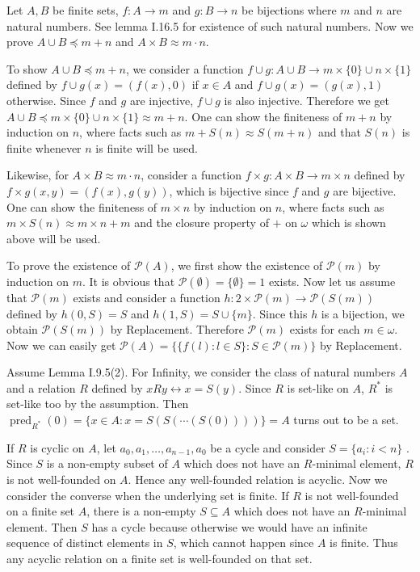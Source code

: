 \documentclass[12pt]{article}
\newcommand{\pred}{\mathop{\mathrm{pred}}}
\theoremstyle{definition}
\newenvironment{customthm}[1]
  {\renewcommand\theinnercustomthm{#1}\innercustomthm}
  {\endinnercustomthm}
\begin{document}
\begin{customthm}{I.7.27}
  Let $A,B$ be finite sets, $f:A\rightarrow m$ and $g:B\rightarrow n$ be bijections where $m$ and $n$ are natural numbers. See lemma I.16.5 for existence of such natural numbers. Now we prove $A\cup B\preccurlyeq m+n$ and $A\times B\approx m\cdot n$.

  To show $A\cup B\preccurlyeq m+n$, we consider a function $f\cup g:A\cup B\rightarrow m\times\{0\}\cup n\times\{1\}$ defined by $f\cup g(x)=(f(x),0)$ if $x\in A$ and $f\cup g(x)=(g(x),1)$ otherwise. Since $f$ and $g$ are injective, $f\cup g$ is also injective. Therefore we get $A\cup B\preccurlyeq m\times\{0\}\cup n\times\{1\}\approx m+n$. One can show the finiteness of $m+n$ by induction on $n$, where facts such as $m+S(n)\approx S(m+n)$ and that $S(n)$ is finite whenever $n$ is finite will be used.

  Likewise, for $A\times B\approx m\cdot n$, consider a function $f\times g:A\times B\rightarrow m\times n$ defined by $f\times g(x,y)=(f(x),g(y))$, which is bijective since $f$ and $g$ are bijective. One can show the finiteness of $m\times n$ by induction on $n$, where facts such as $m\times S(n)\approx m\times n+m$ and the closure property of $+$ on $\omega$ which is shown above will be used.

  To prove the existence of $\mathcal{P}(A)$, we first show the existence of $\mathcal{P}(m)$ by induction on $m$. It is obvious that $\mathcal{P}(\emptyset)=\{\emptyset\}=1$ exists. Now let us assume that $\mathcal{P}(m)$ exists and consider a function $h:2\times\mathcal{P}(m)\rightarrow\mathcal{P}(S(m))$ defined by $h(0,S)=S$ and $h(1,S)=S\cup\{m\}$. Since this $h$ is a bijection, we obtain $\mathcal{P}(S(m))$ by Replacement. Therefore $\mathcal{P}(m)$ exists for each $m\in\omega$. Now we can easily get $\mathcal{P}(A)=\{\{f(l):l\in S\}:S\in\mathcal{P}(m)\}$ by Replacement.
\end{customthm}

\begin{customthm}{I.9.6}
  Assume Lemma I.9.5(2). For Infinity, we consider the class of natural numbers $A$ and a relation $R$ defined by $xRy\leftrightarrow x=S(y)$. Since $R$ is set-like on $A$, $R^*$ is set-like too by the assumption. Then $\pred_{R^*}(0)=\{x\in A:x=S(S(\cdots (S(0))))\}=A$ turns out to be a set.
\end{customthm}

\begin{customthm}{I.9.8}
  If $R$ is cyclic on $A$, let $a_0,a_1,\ldots,a_{n-1},a_0$ be a cycle and consider $S=\{a_i:i<n\}$ . Since $S$ is a non-empty subset of $A$ which does not have an $R$-minimal element, $R$ is not well-founded on $A$. Hence any well-founded relation is acyclic. Now we consider the converse when the underlying set is finite. If $R$ is not well-founded on a finite set $A$, there is a non-empty $S\subseteq A$ which does not have an $R$-minimal element. Then $S$ has a cycle because otherwise we would have an infinite sequence of distinct elements in $S$, which cannot happen since $A$ is finite. Thus any acyclic relation on a finite set is well-founded on that set.
\end{customthm}
\end{document}
